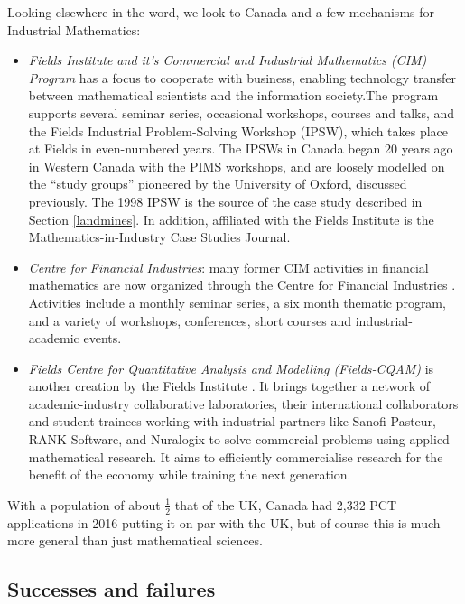 \documentclass[11pt]{article} %
\begin{document}
	Looking elsewhere in the word, we look to Canada and a few  mechanisms for Industrial Mathematics: 
	

	\begin{itemize}
		\item \textit{Fields Institute and it's Commercial and Industrial Mathematics (CIM) Program} \cite{FieldsCIM}  has a focus to cooperate with business, enabling technology transfer between mathematical scientists and the information society.The program supports several seminar series, occasional workshops, courses and talks, and the Fields Industrial Problem-Solving Workshop (IPSW), which takes place at Fields in even-numbered years. The IPSWs in Canada began 20 years ago in Western Canada with the PIMS workshops, and are loosely modelled on the “study groups” pioneered by the University of Oxford, discussed previously. The 1998 IPSW is the source of the case study described in Section \ref{landmines}.
		 In addition, affiliated with  the Fields Institute is the  Mathematics-in-Industry Case Studies Journal.
		\item \textit{Centre for Financial Industries}: many former CIM activities in financial mathematics are now organized through the Centre for Financial Industries \cite{FieldsCFI}. Activities include a monthly seminar series, a  six month thematic program, and a variety of workshops, conferences, short courses and industrial-academic events. 
		\item \textit{Fields Centre for Quantitative Analysis and Modelling (Fields-CQAM)} is another creation by the Fields Institute \cite{CQAM}. It brings together a network of academic-industry collaborative laboratories, their international collaborators and  student trainees working   with industrial partners like Sanofi-Pasteur, RANK Software, and Nuralogix to solve commercial problems using applied mathematical research. It aims to efficiently commercialise research for the benefit of the economy while training the next generation.
	\end{itemize}
	

	
With a population of about $\frac{1}{2}$ that of the UK, Canada had 2,332 PCT applications in 2016 \cite{WIPO} putting it on par with the UK, but of course this is much more general than just mathematical sciences.

	\subsection{Successes and failures \label{SF}}
	
\end{document}
